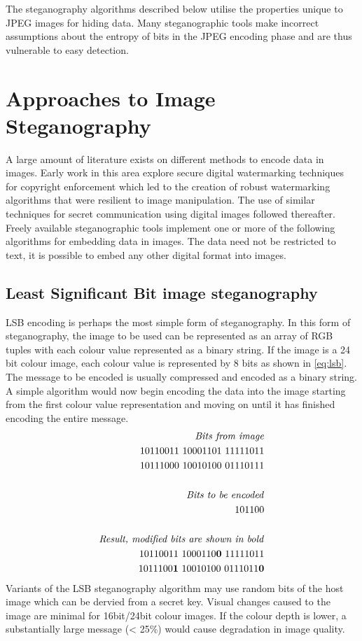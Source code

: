 The steganography algorithms described below utilise the properties unique to JPEG images for hiding data. Many steganographic tools make incorrect assumptions about the entropy of bits in the JPEG encoding phase and are thus vulnerable to easy detection.
\section{Approaches to Image Steganography}
\label{sec:overview}
A large amount of literature exists on different methods to encode data in images. Early work in this area explore secure digital watermarking techniques for copyright enforcement which led to the creation of robust watermarking algorithms that were resilient to image manipulation. The use of similar techniques for secret communication using digital images followed thereafter. Freely available steganographic tools implement one or more of the following algorithms for embedding data in images. The data need not be restricted to text, it is possible to embed any other digital format into images. 
\subsection {Least Significant Bit image steganography}  LSB encoding is perhaps the most simple form of steganography. In this form of steganography, the image to be used can be represented as an array of RGB tuples with each colour value represented as a binary string. If the image is a 24 bit colour image, each colour value is represented by 8 bits as shown in \ref{eq:lsb}. The message to be encoded is usually compressed and encoded as a binary string. A simple algorithm would now begin encoding the data into the image starting from the first colour value representation and moving on until it has finished encoding the entire message. 
\begin{equation}
\label{eq:lsb}
\begin{split}
\text{\emph{Bits from image}}
\\
10110011\ 10001101\ 11111011 \\
10111000\ 10010100\ 01110111 \\
\\
\text{\emph{Bits to be encoded}}
\\
101100\\
\\
\text{\emph{Result, modified bits are shown in bold}}
\\
10110011\ 1000110\mathbf{0}\ 11111011 \\
1011100\mathbf{1}\ 10010100\ 0111011\mathbf{0} \\
\end{split}
\end{equation}
Variants of the LSB steganography algorithm may use random bits of the host image which can be dervied from a secret key. Visual changes caused to the image are minimal for 16bit/24bit colour images. If the colour depth is lower, a substantially large message (< 25\%) would cause degradation in image quality. 
